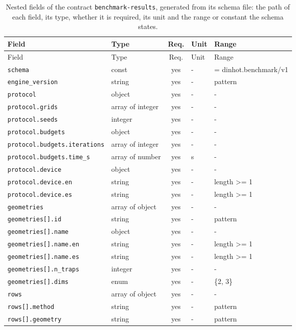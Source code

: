 \begingroup\scriptsize
\begin{longtable}{@{}l l c l l@{}}
\caption{Nested fields of the contract \texttt{benchmark-results}, generated from its schema file: the path of each field, its type, whether it is required, its unit and the range or constant the schema states.}\label{tab:fields-benchmark-results}\\
\toprule Field & Type & Req. & Unit & Range\\\midrule\endfirsthead
\toprule Field & Type & Req. & Unit & Range\\\midrule\endhead
\texttt{schema} & const & yes & - & = dinhot.benchmark/v1\\
\texttt{engine\_version} & string & yes & - & pattern\\
\texttt{protocol} & object & yes & - & -\\
\texttt{protocol.grids} & array of integer & yes & - & -\\
\texttt{protocol.seeds} & integer & yes & - & -\\
\texttt{protocol.budgets} & object & yes & - & -\\
\texttt{protocol.budgets.iterations} & array of integer & yes & - & -\\
\texttt{protocol.budgets.time\_s} & array of number & yes & s & -\\
\texttt{protocol.device} & object & yes & - & -\\
\texttt{protocol.device.en} & string & yes & - & length >= 1\\
\texttt{protocol.device.es} & string & yes & - & length >= 1\\
\texttt{geometries} & array of object & yes & - & -\\
\texttt{geometries[].id} & string & yes & - & pattern\\
\texttt{geometries[].name} & object & yes & - & -\\
\texttt{geometries[].name.en} & string & yes & - & length >= 1\\
\texttt{geometries[].name.es} & string & yes & - & length >= 1\\
\texttt{geometries[].n\_traps} & integer & yes & - & -\\
\texttt{geometries[].dims} & enum & yes & - & \{2, 3\}\\
\texttt{rows} & array of object & yes & - & -\\
\texttt{rows[].method} & string & yes & - & pattern\\
\texttt{rows[].geometry} & string & yes & - & pattern\\

\end{longtable}

